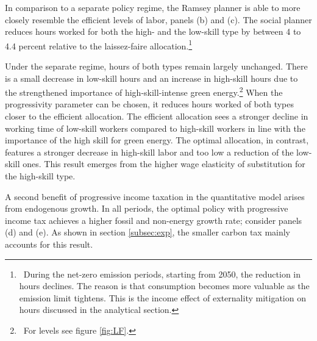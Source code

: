 \begin{figure}[h!!!]
\begin{minipage}[]{0.32\textwidth}
	\end{minipage}
\end{figure} 
%
In comparison to a separate policy regime, the Ramsey planner is able to more closely resemble the efficient levels of labor, panels (b) and (c). 
The social planner reduces hours worked for both the high- and the low-skill type by between 4 to 4.4 percent relative to the laissez-faire allocation.\footnote{\ During the net-zero emission periods, starting from 2050, the reduction in hours declines. The reason is that consumption becomes more valuable as the emission limit tightens. This is the income effect of  externality mitigation on hours discussed in the analytical section.} %

Under the separate regime, hours of both types remain largely unchanged. There is a small decrease in low-skill hours and an increase in high-skill hours due to the strengthened importance of high-skill-intense green energy.\footnote{\ For levels see figure \ref{fig:LF}.} When the progressivity parameter can be chosen, it reduces hours worked of both types closer to the efficient allocation. The efficient allocation sees a stronger decline in working time of low-skill workers compared to high-skill workers in line with the importance of the high skill for green energy. The optimal allocation, in contrast, features a stronger decrease in high-skill labor and too low a reduction of the low-skill ones. This result emerges from the higher wage elasticity of substitution for the high-skill type.

A second benefit of progressive income taxation in the quantitative model arises from endogenous growth. 
In all periods, the optimal policy with progressive income tax achieves a higher fossil and non-energy growth rate; consider panels (d) and (e).
As shown in section \ref{subsec:exp}, the smaller carbon tax mainly accounts for this result. 

